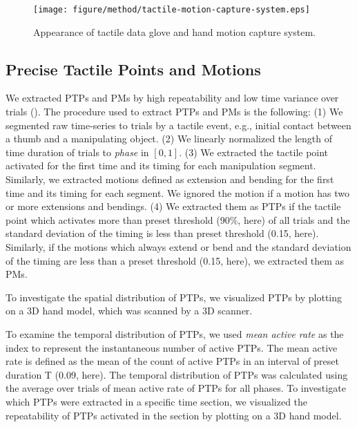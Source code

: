 \documentclass[letterpaper, 10 pt, conference]{IEEEtran}  %
\begin{document}
\begin{figure}[t!]
 \centering
  \texttt{[image: figure/method/tactile-motion-capture-system.eps]}
 \caption{Appearance of tactile data glove and hand motion capture system.}
 \label{fig:glove}
\end{figure}


\subsection{Precise Tactile Points and Motions}

We extracted PTPs and PMs by high repeatability and low time variance over trials (). The procedure used to extract PTPs and PMs is the following: (1) We segmented raw time-series to trials by a tactile event, e.g., initial contact between a thumb and a manipulating object. (2) We linearly normalized the length of time duration of trials to {\it phase} in $[0, 1]$. (3) We extracted the tactile point activated for the first time and its timing for each manipulation segment. Similarly, we extracted motions defined as extension and bending for the first time and its timing for each segment. We ignored the motion if a motion has two or more extensions and bendings. (4) We extracted them as PTPs if the tactile point which activates more than preset threshold (90\%, here) of all trials and the standard deviation of the timing is less than preset threshold (0.15, here). Similarly, if the motions which always extend or bend and the standard deviation of the timing are less than a preset threshold (0.15, here), we extracted them as PMs. 

To investigate the spatial distribution of PTPs, we visualized PTPs by plotting on a 3D hand model, which was scanned by a 3D scanner.  

To examine the temporal distribution of PTPs, we used {\it mean active rate} as the index to represent the instantaneous number of active PTPs. The mean active rate is defined as the mean of the count of active PTPs in an interval of preset duration T (0.09, here). The temporal distribution of PTPs was calculated using the average over trials of mean active rate of PTPs for all phases. To investigate which PTPs were extracted in a specific time section, we visualized the repeatability of PTPs activated in the section by plotting on a 3D hand model.
\end{document}
